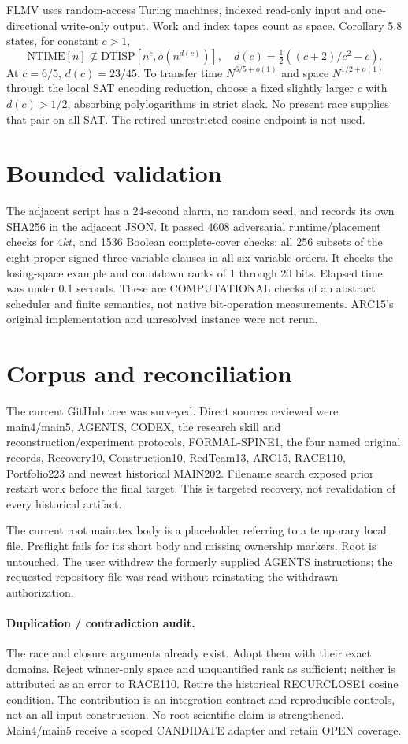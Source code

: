 \documentclass[11pt]{article}
\begin{document}
FLMV uses random-access Turing machines, indexed read-only input and
one-directional write-only output. Work and index tapes count as space.
Corollary 5.8 states, for constant $c>1$,
\[
 \mathrm{NTIME}[n]\not\subseteq
 \mathrm{DTISP}[n^c,o(n^{d(c)})],\quad
 d(c)=\tfrac12((c+2)/c^2-c).
\]
At $c=6/5$, $d(c)=23/45$. To transfer time $N^{6/5+o(1)}$ and space
$N^{1/2+o(1)}$ through the local SAT encoding reduction, choose a fixed
slightly larger $c$ with $d(c)>1/2$, absorbing polylogarithms in strict slack.
No present race supplies that pair on all SAT. The retired unrestricted
cosine endpoint is not used.

\section{Bounded validation}
The adjacent script has a 24-second alarm, no random seed, and records its
own SHA256 in the adjacent JSON. It passed 4608 adversarial runtime/placement
checks for $4kt$, and 1536 Boolean complete-cover checks: all 256 subsets of
the eight proper signed three-variable clauses in all six variable orders.
It checks the losing-space example and countdown ranks of 1 through 20 bits.
Elapsed time was under 0.1 seconds. These are COMPUTATIONAL checks of an
abstract scheduler and finite semantics, not native bit-operation measurements.
ARC15's original implementation and unresolved instance were not rerun.

\section{Corpus and reconciliation}
The current GitHub tree was surveyed. Direct sources reviewed were
main4/main5, AGENTS, CODEX, the research skill and reconstruction/experiment
protocols, FORMAL-SPINE1, the four named original records, Recovery10,
Construction10, RedTeam13, ARC15, RACE110, Portfolio223 and newest historical
MAIN202. Filename search exposed prior restart work before the final target.
This is targeted recovery, not revalidation of every historical artifact.

The current root main.tex body is a placeholder referring to a temporary
local file. Preflight fails for its short body and missing ownership markers.
Root is untouched. The user withdrew the formerly supplied AGENTS
instructions; the requested repository file was read without reinstating
the withdrawn authorization.

\paragraph{Duplication / contradiction audit.}
The race and closure arguments already exist. Adopt them with their exact
domains. Reject winner-only space and unquantified rank as sufficient;
neither is attributed as an error to RACE110. Retire the historical
RECURCLOSE1 cosine condition. The contribution is an integration contract
and reproducible controls, not an all-input construction.
No root scientific claim is strengthened. Main4/main5 receive a scoped
CANDIDATE adapter and retain OPEN coverage.
\end{document}
